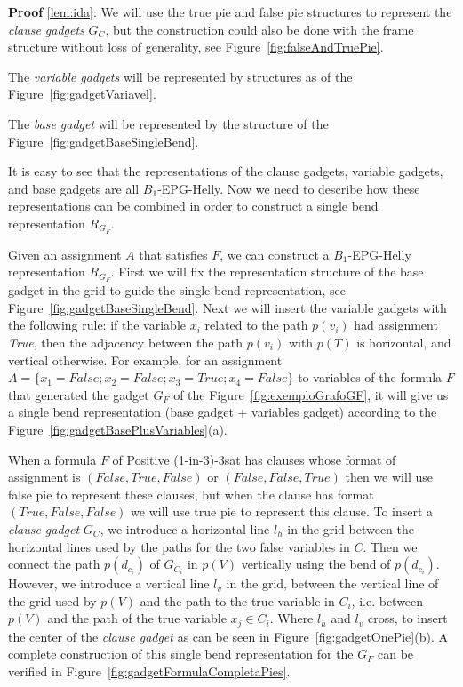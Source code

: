 \documentclass[9pt]{entcs}
\begin{document}
\begin{prove*}
\textbf{Proof} \ref{lem:ida}:
We will use the true pie and false pie structures to represent the \textit{clause gadgets} $ G_C$, but the construction could also be done with the frame structure without loss of generality, see Figure~\ref{fig:falseAndTruePie}.  




The \textit{variable gadgets} will be represented by structures as of the Figure~\ref{fig:gadgetVariavel}.




The \textit{base gadget} will be represented by the structure of the Figure~\ref{fig:gadgetBaseSingleBend}.



It is easy to see that the representations of the clause gadgets, variable gadgets, and base gadgets are all $B_1$-EPG-Helly. Now we need to describe how these representations can be combined in order to construct a single bend representation $R_{G_F}$.

Given an assignment $A$ that satisfies $F$, we can construct a  $B_{1}$-EPG-Helly representation $R_{G_F}$. First we will fix the representation structure of the base gadget in the grid to guide the single bend representation, see Figure~\ref{fig:gadgetBaseSingleBend}. Next we will insert the variable gadgets with the following rule: if the  variable $x_i$ related to the path $p(v_i)$ had assignment \textit{True}, then the adjacency between the path $p(v_i)$ with $p(T)$ is horizontal, and vertical otherwise. For example, for an assignment $A=\{x_1=False; x_2=False;x_3=True; x_4=False\}$  to variables of the formula $F$ that generated the gadget $G_F$ of the Figure~\ref{fig:exemploGrafoGF}, it will give us a single bend representation (base gadget + variables gadget) according to the Figure~\ref{fig:gadgetBasePlusVariables}(a). 

 When a formula $F$ of {\sc Positive (1-in-3)-3sat} has clauses whose format of assignment is $(False, True, False)$ or $(False, False, True)$ then we will use false pie to represent these clauses, but when the clause has format $(True, False, False)$ we will use true pie to represent this clause. To insert a \textit{ clause gadget} $G_{C}$, we introduce a horizontal line $l_{h}$ in the grid between the horizontal lines used by the paths for the two false variables in $ C $. Then we connect the path $p(d_{c_i})$ of $G_{C_i}$ in $p(V)$ vertically using the bend of $p(d_{c_i})$. However, we introduce a vertical line $ l_{v}$ in the grid, between the vertical line of the grid used by $p(V)$ and the path to the true variable in $C_i$, i.e. between $p(V)$ and the path of the true variable $x_j \in C_i$. Where $l_{h}$ and $l_{v}$ cross, to insert the center of the  \textit{clause gadget} as can be seen in Figure~\ref{fig:gadgetOnePie}(b). A complete construction of this single bend representation for the $G_F$ can be verified in 
Figure~\ref{fig:gadgetFormulaCompletaPies}.%


\end{prove*}
\end{document}
